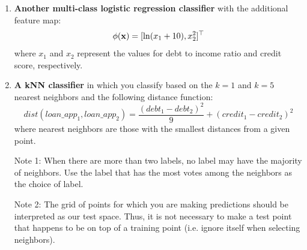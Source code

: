 \documentclass[submit]{../harvardml}
\begin{document}
\begin{problem}
\begin{enumerate}[label=\alph*)]
  \item \textbf{Another multi-class logistic regression classifier} with the additional feature map:
  $$\phi(\mathbf{x}) = [\ln (x_1+10), x_2^2]^\top$$
  where $x_1$ and $x_2$ represent the values for debt to income ratio and credit score, respectively.

  \item \textbf{A kNN classifier} in which you classify based on the $k = 1$ and $k = 5$ nearest neighbors and the following distance function: $$dist(loan\_app_1, loan\_app_2) = \frac{(debt_1 - debt_2)^2}{9} + (credit_1 - credit_2)^2$$
        where nearest neighbors are those with the smallest distances from a given point.

        Note 1: When there are more than two labels, no label may have the
        majority of neighbors.  Use the label that has the most votes among
        the neighbors as the choice of label.

        Note 2: The grid of points for which you are making predictions
        should be interpreted as our test space.  Thus, it is not necessary
        to make a test point that happens to be on top of a training point
        (i.e. ignore itself when selecting neighbors).
\end{enumerate}
\end{problem}

\newpage
\end{document}
